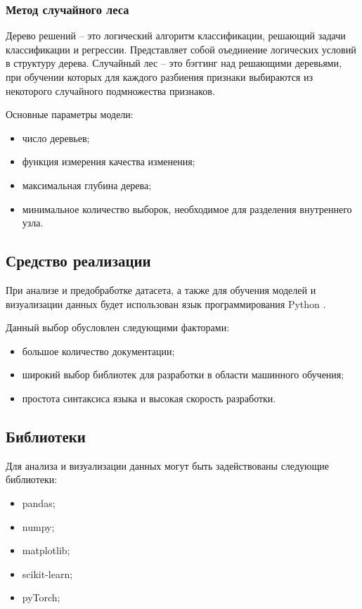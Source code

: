 \subsubsection{Метод случайного леса}
Дерево решений -- это логический алгоритм классификации, решающий задачи классификации и регрессии. Представляет собой оъединение логических условий в структуру дерева. Случайный лес -- это бэггинг над решающими деревьями, при обучении которых для каждого разбиения признаки выбираются из некоторого случайного подмножества признаков. \cite{randomforest}

Основные параметры модели:
\begin{itemize}
\item число деревьев;
\item функция измерения качества изменения;
\item максимальная глубина дерева;
\item минимальное количество выборок, необходимое для разделения внутреннего узла.
\end{itemize}

\subsection{Средство реализации}

При анализе и предобработке датасета, а также для обучения моделей и визуализации данных будет использован язык программирования Python \cite{Python}.

Данный выбор обусловлен следующими факторами:

\begin{itemize}
\item большое количество документации;
\item широкий выбор библиотек для разработки в области машинного обучения;
\item простота синтаксиса языка и высокая скорость разработки.
\end{itemize}

\subsection{Библиотеки}

Для анализа и визуализации данных могут быть задействованы следующие библиотеки:

\begin{itemize}
\item pandas;
\item numpy;
\item matplotlib;
\item scikit-learn;
\item pyTorch;
\end{itemize}

